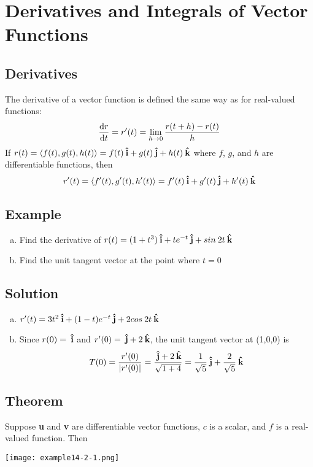 \section{Derivatives and Integrals of Vector Functions}

\subsection*{Derivatives}
The derivative of a vector function is defined the same way as for real-valued functions:
$$\dv{r}{t}=r'(t)=\lim_{h\to 0}\frac{r(t+h)-r(t)}{h}$$
If $r(t)=\ev{f(t),g(t),h(t)}=f(t)\ihat+g(t)\jhat+h(t)\khat$ where $f$, $g$, and $h$
are differentiable functions, then
$$r'(t)=\ev{f'(t),g'(t),h'(t)}=f'(t)\ihat+g'(t)\jhat+h'(t)\khat$$

\subsection*{Example}
\begin{enumerate}[(a)]
    \item Find the derivative of $r(t)=(1+t^3)\:\boldsymbol{\hat{\textbf{i}}}+te^{-t}\:\boldsymbol{\hat{\textbf{j}}}+sin\:2t\:\boldsymbol{\hat{\textbf{k}}}$
    \item Find the unit tangent vector at the point where $t=0$
\end{enumerate}

\subsection*{Solution}
\begin{enumerate}[(a)]
    \item $r'(t)=3t^2\:\boldsymbol{\hat{\textbf{i}}}+(1-t)e^{-t}\:\boldsymbol{\hat{\textbf{j}}}+2cos\:2t\:\boldsymbol{\hat{\textbf{k}}}$
    \item Since $r(0)=\:\boldsymbol{\hat{\textbf{i}}}$ and $r'(0)=\:\boldsymbol{\hat{\textbf{j}}}+2\:\boldsymbol{\hat{\textbf{k}}}$, the unit tangent vector at
          (1,0,0) is $$T(0)=\frac{r'(0)}{|r'(0)|}=\frac{\:\boldsymbol{\hat{\textbf{j}}}+2\:\boldsymbol{\hat{\textbf{k}}}}{\sqrt{1+4}}=
              \frac{1}{\sqrt{5}}\:\boldsymbol{\hat{\textbf{j}}}+\frac{2}{\sqrt{5}}\:\boldsymbol{\hat{\textbf{k}}}$$
\end{enumerate}

\subsection*{Theorem}
Suppose \textbf{u} and \textbf{v} are differentiable vector functions, $c$ is a scalar,
and $f$ is a real-valued function. Then
\begin{center}
    \texttt{[image: example14-2-1.png]}
\end{center}

